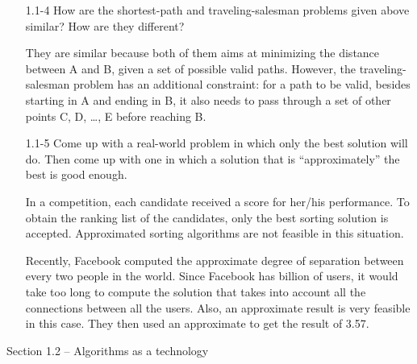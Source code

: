 \begin{enumerate}
\item[1.1{-}4] How are the shortest-path and traveling-salesman problems
  given above similar? How are they different?

\begin{framed}
They are similar because both of them aims at minimizing the distance between
A and B, given a set of possible valid paths. However, the traveling-salesman
problem has an additional constraint: for a path to be valid, besides starting
in A and ending in B, it also needs to pass through a set of other points C, D,
\ldots, E before reaching B.
\end{framed}

\item[1.1{-}5] Come up with a real-world problem in which only the best
  solution will do. Then come up with one in which a solution that is
  ``approximately'' the best is good enough.

\begin{framed}
In a competition, each candidate received a score for her/his performance. To
obtain the ranking list of the candidates, only the best sorting solution is
accepted. Approximated sorting algorithms are not feasible in this situation.

Recently, Facebook computed the approximate degree of separation between every
two people in the world. Since Facebook has billion of users, it would take too
long to compute the solution that takes into account all the connections between
all the users. Also, an approximate result is very feasible in this case. They
then used an approximate to get the result of 3.57.
\end{framed}

\end{enumerate}

\pagebreak

{\large Section 1.2 {--} Algorithms as a technology}

